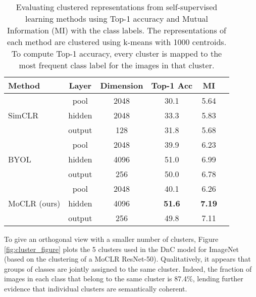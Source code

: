 \documentclass[final]{cvpr}
\newcommand\baseline{MoCLR}
\begin{document}
\begin{table}[t]
\caption{Evaluating clustered representations from self-supervised learning methods using Top-1 accuracy and Mutual Information (MI) with the class labels. The representations of each method are clustered using k-means with 1000 centroids. To compute Top-1 accuracy, every cluster is mapped to the most frequent class label for the images in that cluster.}
\label{tab:clustering_results}
\begin{center}
\begin{small}
\vspace{-6pt}
\begin{tabular}{lccccc}
\toprule
Method & Layer & Dimension & Top-1 Acc & MI \\
\midrule 
\multirow{3}{*}{SimCLR~\cite{chen2020simple}} 
& pool & 2048 & 30.1 & 5.64 \\
& hidden & 2048 & 33.3 & 5.83 \\
& output & 128 & 31.8 & 5.68 \\ 
\midrule 
\multirow{3}{*}{BYOL~\cite{grill2020bootstrap}} 
& pool & 2048 & 39.9 & 6.23 \\
& hidden & 4096 & 51.0 & 6.99 \\
& output & 256 & 50.0 & 6.78 \\ 
\midrule 
\multirow{3}{*}{\baseline{} (ours)} 
& pool & 2048 & 40.1 & 6.26 \\
& hidden & 4096 & \textbf{51.6} & \textbf{7.19} \\
& output & 256 & 49.8 & 7.11 \\ 
\bottomrule
\end{tabular}
\end{small}
\end{center}
\vskip -0.1in
\vspace{-8pt}
\end{table}


To give an orthogonal view with a smaller number of clusters, Figure \ref{fig:cluster_figure} plots the 5 clusters used in the DnC model for ImageNet (based on the clustering of a \baseline{} ResNet-50).
Qualitatively, it appears that groups of classes are jointly assigned to the same cluster. Indeed, 
the fraction of images in each class that belong to the same cluster is 87.4\%, lending further evidence that individual clusters are semantically coherent.
\end{document}
